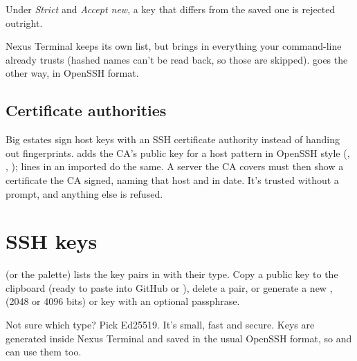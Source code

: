 Under \emph{Strict} and \emph{Accept new}, a key that differs from the saved one is rejected outright.


\begin{quickwin}
Nexus Terminal keeps its own list, but  brings in everything your
command-line  already trusts (hashed names can't be read back, so those are skipped).  goes the
other way, in OpenSSH format.
\end{quickwin}

\section{Certificate authorities}

Big estates sign host keys with an SSH certificate authority instead of handing out fingerprints. 
adds the CA's public key for a host pattern in OpenSSH style (, ,
);  lines in an imported  do the same. A server the CA
covers must then show a certificate the CA signed, naming that host and in date. It's trusted without a prompt, and
anything else is refused.


\chapter{SSH keys}\label{ch:keys}

 (or the palette) lists the key pairs in  with their type. Copy a
public key to the clipboard (ready to paste into GitHub or ), delete a pair, or generate a new
,  (2048 or 4096 bits) or  key with an optional passphrase.


\begin{protip}
Not sure which type? Pick Ed25519. It's small, fast and secure. Keys are generated inside Nexus Terminal and
saved in the usual OpenSSH format, so  and  can use them too.
\end{protip}


